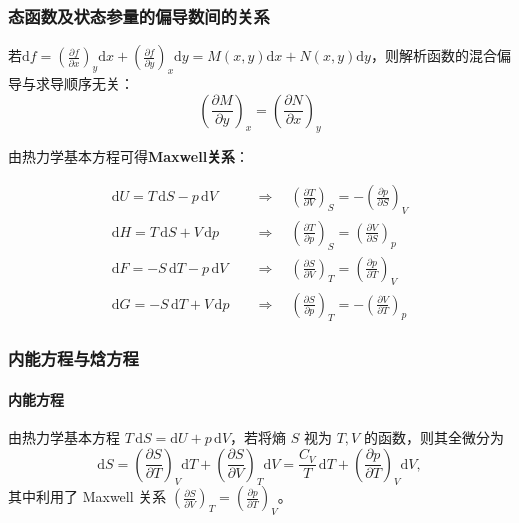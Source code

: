 \documentclass[UTF8]{ctexart}
\theoremstyle{definition}
\begin{document}
\subsubsection*{态函数及状态参量的偏导数间的关系}

若$\mathrm{d}f = \left(\frac{\partial f}{\partial x}\right)_y\mathrm{d}x + \left(\frac{\partial f}{\partial y}\right)_x\mathrm{d}y = M(x,y)\mathrm{d}x + N(x,y)\mathrm{d}y$，则解析函数的混合偏导与求导顺序无关：
\begin{equation}
\left(\frac{\partial M}{\partial y}\right)_x = \left(\frac{\partial N}{\partial x}\right)_y
\end{equation}

由热力学基本方程可得\textbf{Maxwell关系}：

\begin{align}
\mathrm{d}U = T\,\mathrm{d}S - p\,\mathrm{d}V &\quad\Rightarrow\quad \left(\frac{\partial T}{\partial V}\right)_S = -\left(\frac{\partial p}{\partial S}\right)_V \\[4pt]
\mathrm{d}H = T\,\mathrm{d}S + V\,\mathrm{d}p &\quad\Rightarrow\quad \left(\frac{\partial T}{\partial p}\right)_S = \left(\frac{\partial V}{\partial S}\right)_p \\[4pt]
\mathrm{d}F = -S\,\mathrm{d}T - p\,\mathrm{d}V &\quad\Rightarrow\quad \left(\frac{\partial S}{\partial V}\right)_T = \left(\frac{\partial p}{\partial T}\right)_V \\[4pt]
\mathrm{d}G = -S\,\mathrm{d}T + V\,\mathrm{d}p &\quad\Rightarrow\quad \left(\frac{\partial S}{\partial p}\right)_T = -\left(\frac{\partial V}{\partial T}\right)_p
\end{align}

\subsubsection*{内能方程与焓方程}

\paragraph{内能方程}

由热力学基本方程 $T\,\mathrm{d}S = \mathrm{d}U + p\,\mathrm{d}V$，若将熵 $S$ 视为 $T,V$ 的函数，则其全微分为
\begin{equation}
\mathrm{d}S = \left(\frac{\partial S}{\partial T}\right)_V\mathrm{d}T + \left(\frac{\partial S}{\partial V}\right)_T\mathrm{d}V
= \frac{C_V}{T}\,\mathrm{d}T + \left(\frac{\partial p}{\partial T}\right)_V\mathrm{d}V,
\end{equation}
其中利用了 Maxwell 关系 $\displaystyle\left(\frac{\partial S}{\partial V}\right)_T = \left(\frac{\partial p}{\partial T}\right)_V$。
\end{document}
